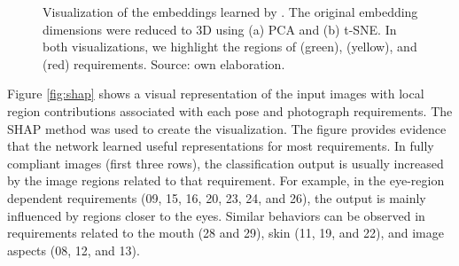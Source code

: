 \begin{figure}[htb]
\centering
{}
\caption{Visualization of the embeddings learned by \methodname. The original embedding dimensions were reduced to 3D using (a) PCA and (b) t-SNE. In both visualizations, we highlight the regions of \variedbackground (green), \unnaturalskintone (yellow), and \veiloverface (red) requirements. Source: own elaboration.}
\label{fig:embviz}
\end{figure}
 
Figure \ref{fig:shap} shows a visual representation of the input images with local region contributions associated with each pose and photograph requirements. The SHAP method was used to create the visualization. The figure provides evidence that the network learned useful representations for most requirements. In fully compliant images (first three rows), the classification output is usually increased by the image regions related to that requirement. For example, in the eye-region dependent requirements (09, 15, 16, 20, 23, 24, and 26), the output is mainly influenced by regions closer to the eyes. Similar behaviors can be observed in requirements related to the mouth (28 and 29), skin (11, 19, and 22), and image aspects (08, 12, and 13). 
 
